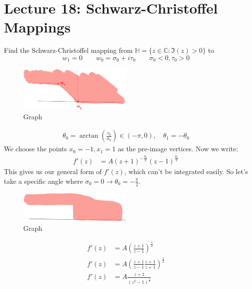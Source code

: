 \chapter{Lecture 18: Schwarz-Christoffel Mappings}

\begin{example}
    Find the Schwarz-Christoffel mapping from $\mathbb{H} = \{z \in \mathbb{C} : \Im(z) > 0\}$ to
    $$w_1 = 0 \qquad w_0 = \sigma_0 + i\tau_0\qquad \sigma_0 < 0, \tau_0 > 0$$
    \begin{figure}[H]
        \centering
        \includegraphics[width=0.5\textwidth]{LECTURE_18/graph.png}
        \caption{Graph}
    \end{figure}
    \begin{align}
        \theta_0 = \arctan(\frac{\tau_0}{\sigma_0}) \in (-\pi, 0), \quad \theta_1 = -\theta_0
    \end{align}
    We choose the points $x_0 = -1, x_1 = 1$ as the pre-image vertices. Now we write:
    \begin{align}
        f'(z) & = A (z + 1)^{-\frac{\theta_0}\pi} (z - 1)^{\frac{\theta_0}\pi}
    \end{align}
    This gives us our general form of $f'(z)$, which can't be integrated easily. So let's take a specific angle  where $\sigma_0 = 0 \rightarrow \theta_0 = -\frac{\pi}{2}$.
    \begin{figure}[H]
        \centering
        \includegraphics[width=0.5\textwidth]{LECTURE_18/graph1.png}
        \caption{Graph}
    \end{figure}
    \begin{align}
        f'(z) & = A \left(\frac{z + 1}{z - 1}\right)^{\frac{1}{2}}                                                      \\
        f'(z) & = A\left(\frac{z + 1}{z - 1}\frac{z + 1}{z + 1}\right)^{\frac{1}{2}}                                    \\
        f'(z) & = A\frac{z + 1}{(z^2 - 1)^{\frac{1}{2}}}                                                                \\

\end{align}
\end{example}
